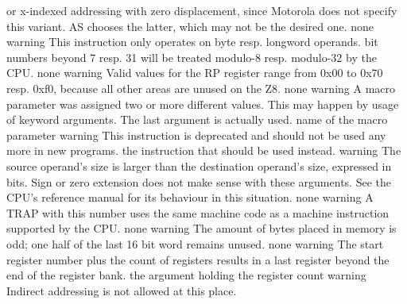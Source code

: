 \documentclass[12pt,twoside]{report}
\newcommand{\asname}{{AS}}
\begin{document}
\begin{description}
{                or x-indexed addressing with zero displacement, since
                Motorola does not specify this variant.  \asname{} chooses the
                latter, which may not be the desired one.}
               {none}
               {warning}
               {This instruction only operates on byte resp. longword
                operands.  bit numbers beyond 7 resp. 31 will be treated
                modulo-8 resp. modulo-32 by the CPU.}
               {none}
               {warning}
               {Valid values for the RP register range from 0x00 to 0x70 resp.
                0xf0, because all other areas are unused on the Z8.}
               {none}
               {warning}
               {A macro parameter was assigned two or more
                different values.  This may happen by usage of
                keyword arguments.  The last argument is actually
                used.}
               {name of the macro parameter}
               {warning}
               {This instruction is deprecated and should not be used any
                more in new programs.}
               {the instruction that should be used instead.}
               {warning}
               {The source operand's size is larger than the destination operand's
                size, expressed in bits.  Sign or zero extension does not make sense
                with these arguments.  See the CPU's reference manual for its behaviour
                in this situation.}
               {none}
               {warning}
               {A TRAP with this number uses the same machine code as a 
                machine instruction supported by the CPU.}
               {none}
               {warning}
               {The amount of bytes placed in memory is odd; one half of the last
                16 bit word remains unused.}
               {none}
               {warning}
               {The start register number plus the count of registers results
                in a last register beyond the end of the register bank.}
               {the argument holding the register count}
               {warning}
               {Indirect addressing is not allowed at this place.
}
\end{description}
\end{document}
